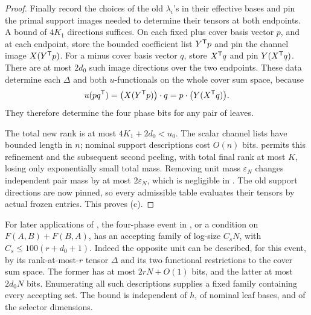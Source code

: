 \begin{proof}
Finally record the choices of the old \(\lambda_i\)'s in their
effective bases and pin the primal support images needed to
determine their tensors at both endpoints.  A bound of \(4K_1\)
directions suffices.  On each fixed plus cover basis vector
\(p\), and at each endpoint, store the bounded coefficient
list \(Y^{\mathsf T} p\) and pin the channel image \(X(Y^{\mathsf T} p)\).
For a minus cover basis vector \(q\), store \(X^{\mathsf T} q\)
and pin \(Y(X^{\mathsf T} q)\).  There are at most \(2d_0\) such
image directions over the two endpoints.  These data determine
each \(\Delta\) and both \(u\)-functionals on the whole cover
sum space, because
\[
 u(pq^{\mathsf T})=\bigl(X(Y^{\mathsf T} p)\bigr)\cdot q
             =p\cdot\bigl(Y(X^{\mathsf T} q)\bigr).
 \]
They therefore determine the four phase bits for any pair
of leaves.

The total new rank is at most \(4K_1+2d_0<u_0\).
The scalar channel lists have bounded length in \(n\);
nominal support descriptions cost \(O(n)\) bits.
 permits this refinement and the subsequent
second peeling, with total final rank at most \(K\), losing
only exponentially small total mass.  Removing unit mass
\(\varepsilon_N\) changes independent pair mass by at most
\(2\varepsilon_N\), which is negligible in
.  The old support directions
are now pinned, so every admissible table evaluates their
tensors by actual frozen entries.  This proves (c).
\end{proof}

\begin{remark}
\label{rem:tiny-accepting-family}
For later applications of , the four-phase
event in , or a condition on
\(F(A,B)+F(B,A)\), has an accepting family of log-size
\(C_sN\), with \(C_s\le100(r+d_0+1)\).
Indeed the opposite unit can be described, for this event,
by its rank-at-most-\(r\) tensor \(\Delta\) and its two
functional restrictions to the cover sum space.
The former has at most \(2rN+O(1)\) bits, and the latter
at most \(2d_0N\) bits.  Enumerating all such descriptions
supplies a fixed family containing every accepting set.
The bound is independent of \(h\), of nominal leaf bases,
and of the selector dimensions.
\end{remark}
